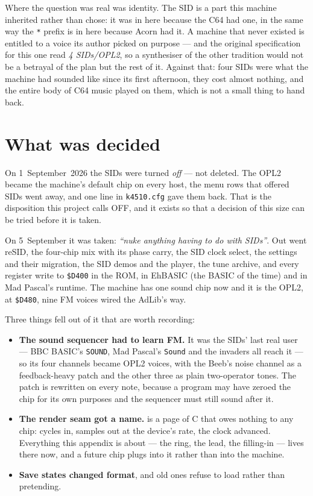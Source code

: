 Where the question was real was identity. The SID is a part this machine
inherited rather than chose: it was in here because the C64 had one, in
the same way the \verb|*| prefix is in here because Acorn had it. A
machine that never existed is entitled to a voice its author picked on
purpose --- and the original specification for this one read \emph{4
SIDs\slash OPL2}, so a synthesiser of the other tradition would not be a
betrayal of the plan but the rest of it. Against that: four SIDs were
what the machine had sounded like since its first afternoon, they cost
almost nothing, and the entire body of C64 music played on them, which
is not a small thing to hand back.

\section{What was decided}
On 1~September~2026 the SIDs were turned \emph{off} --- not deleted. The
OPL2 became the machine's default chip on every host, the menu rows that
offered SIDs went away, and one line in \texttt{k4510.cfg} gave them
back. That is the disposition this project calls OFF, and it exists so
that a decision of this size can be tried before it is taken.

On 5~September it was taken: \emph{``nuke anything having to do with
SIDs''}. Out went reSID, the four-chip mix with its phase carry, the SID
clock select, the settings and their migration, the SID demos and the
player, the tune archive, and every register write to \texttt{\$D400} in
the ROM, in EhBASIC (the BASIC of the time) and in Mad Pascal's runtime. The machine has one
sound chip now and it is the OPL2, at \texttt{\$D480}, nine FM voices
wired the AdLib's way.

Three things fell out of it that are worth recording:

\begin{itemize}[leftmargin=1.4em]
\item \textbf{The sound sequencer had to learn FM.} It was the SIDs' last
  real user --- BBC BASIC's \verb|SOUND|, Mad Pascal's \verb|Sound| and
  the invaders all reach it --- so its four channels became OPL2 voices,
  with the Beeb's noise channel as a feedback-heavy patch and the other
  three as plain two-operator tones. The patch is rewritten on every
  note, because a program may have zeroed the chip for its own purposes
  and the sequencer must still sound after it.
\item \textbf{The render seam got a name.}  is a page
  of C that owes nothing to any chip: cycles in, samples out at the
  device's rate, the clock advanced. Everything this appendix is about
  --- the ring, the lead, the filling-in --- lives there now, and a
  future chip plugs into it rather than into the machine.
\item \textbf{Save states changed format}, and old ones refuse to load
  rather than pretending.
\end{itemize}

